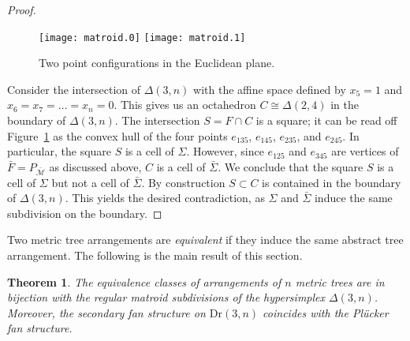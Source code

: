 \documentclass[12pt,a4paper]{amsart}
\newtheorem{thm}{Theorem}[section]
\theoremstyle{definition}
\newcommand{\Dr}{{\mathrm{Dr}}}
\providecommand\cM{{\mathscr{M}}}
\providecommand{\MatroidPolytope}[1]{P_{#1}}
\begin{document}
\begin{proof}
  \begin{figure}[htb]\centering
    \texttt{[image: matroid.0]}
    \hskip 2cm
    \texttt{[image: matroid.1]}
    \caption{Two point configurations in the Euclidean plane.}
    \label{fig:matroid}
  \end{figure}

  Consider the intersection of $\Delta(3,n)$ with the affine space
  defined by $x_5=1$ and $x_6=x_7=\dots=x_n=0$.  This gives us an
  octahedron $C\cong\Delta(2,4)$ in the boundary of $\Delta(3,n)$.
  The intersection $S=F\cap C$ is a square; it can be read off
  Figure~\ref{fig:matroid} as the convex hull of the four points
  $e_{135}$, $e_{145}$, $e_{235}$, and $e_{245}$. In particular, the
  square $S$ is a cell of $\Sigma$. However, since $e_{125}$ and
  $e_{345}$ are vertices of $\bar F=\MatroidPolytope{\bar\cM}$ as
  discussed above, $C$ is a cell of $\bar\Sigma$.  We conclude that
  the square $S$ is a cell of $\Sigma$ but not a cell of $\bar\Sigma$.
  By construction $S\subset C$ is contained in the boundary of
  $\Delta(3,n)$.  This yields the desired contradiction, as $\Sigma$
  and $\bar \Sigma$ induce the same subdivision on the boundary.
\end{proof}

Two metric tree arrangements are \emph{equivalent} if they induce the
same abstract tree arrangement.  The following is the main result of
this section.

\begin{thm}\label{thm:arrangement}
  The equivalence classes of arrangements of $n$ metric trees are in
  bijection with the regular matroid subdivisions of the hypersimplex
  $\Delta(3,n)$.  Moreover, the secondary fan structure on $\Dr(3,n)$
  coincides with the Pl\"ucker fan structure.
\end{thm}
\end{document}
